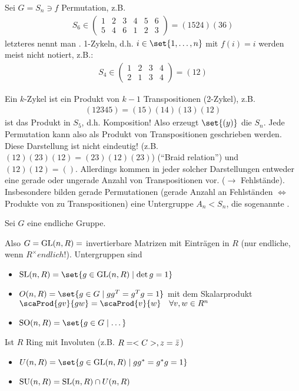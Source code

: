 \begin{example}
	Sei $G = S_n \ni f$ Permutation, z.B.
	\begin{align*} S_6 \in
		\begin{pmatrix}
		1 & 2 &3 &4 & 5 & 6\\
		5 & 4 & 6 & 1 & 2 & 3
		\end{pmatrix}  = (1524)(36)
	\end{align*}
	letzteres nennt man . 1-Zykeln, d.h. $i \in \set{1,\dots,n}$ mit $f(i)=i$ werden meist nicht notiert, z.B.:
	\begin{align*} S_4 \in 
		\begin{pmatrix}
			1&2&3&4\\
			2&1&3&4
		\end{pmatrix} = (12)
	\end{align*}
\end{example}
\begin{remark}
	Ein $k$-Zykel ist ein Produkt von $k-1$ Transpositionen (2-Zykel), z.B.
	\begin{align*}
		(12345) = (15)(14)(13)(12)
	\end{align*}
	ist das Produkt in $S_5$, d.h. Komposition! Also erzeugt $\set{(y)}$ die $S_n$. Jede Permutation kann also als Produkt von Transpositionen geschrieben werden. Diese Darstellung ist nicht eindeutig! (z.B. $(12)(23)(12) = (23)(12)(23)$) (``Braid relation'') %
	und $(12)(12) = ()$. Allerdings kommen in jeder solcher Darstellungen entweder eine gerade oder ungerade Anzahl von Transpositionen vor. ($\to$ Fehlstände). Insbesondere bilden gerade Permutationen (gerade Anzahl an Fehlständen $\Leftrightarrow$ Produkte von zu Transpositionen) eine Untergruppe $A_n < S_n$, die sogenannte .
\end{remark}
Sei $G$ eine endliche Gruppe.
\begin{example}
	Also $G = \operatorname{GL}(n,R) = $ invertierbare Matrizen mit Einträgen in $R$ (nur endliche, wenn $R^{\times} endlich$!). Untergruppen sind
	\begin{itemize}
		\item $\SL(n,R) = \set{g \in \GL(n,R) \mid \det g = 1}$
		\item $O(n,R) = \set{g \in G \mid gg^T = g^T g = 1}$ mit dem Skalarprodukt $\scaProd{gv}{gw} = \scaProd{v}{w} \quad \forall v,w \in R^n$
		\item $\SO(n,R) = \set{g \in G \mid \dots}$ %
	\end{itemize}
	Ist $R$ Ring mit Involuten (z.B. $R = <C>, z = \bar{z}$)
	\begin{itemize}
		\item $U(n,R) = \set{g \in \GL(n,R) \mid gg^{*} = g^{*}g = 1}$
		\item $\operatorname{SU}(n,R) = \operatorname{SL}(n,R) \cap U(n,R)$
	\end{itemize}
\end{example}
